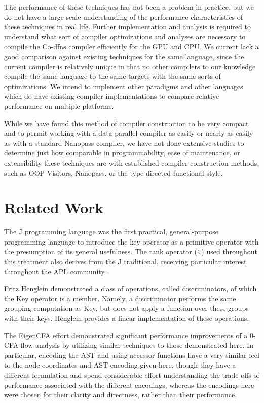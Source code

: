 \documentclass[numbers,preprint]{sigplanconf}
\begin{document}
The performance of these techniques has not been a problem in practice, but 
we do not have a large scale understanding of the performance characteristics 
of these techniques in real life. Further implementation and analysis is 
required to understand what sort of compiler optimizations and analyses are 
necessary to compile the Co-dfns compiler efficiently for the GPU and CPU. 
We current lack a good comparison against existing techniques for the same 
language, since the current compiler is relatively unique in that no other 
compilers to our knowledge compile the same language to the same targets 
with the same sorts of optimizations. We intend to implement other paradigms 
and other languages which do have existing compiler implementations to compare 
relative performance on multiple platforms. 

While we have found this method of compiler construction to be very compact 
and to permit working with a data-parallel compiler as easily or nearly as 
easily as with a standard Nanopass compiler, we have not done extensive 
studies to determine just how comparable in programmability, ease of 
maintenance, or extensibility these techniques are with established 
compiler construction methods, such as OOP Visitors, Nanopass, or the 
type-directed functional style.

\section{Related Work}

The J programming language \cite{hui2014key} was the first practical,
general-purpose programming language to introduce the key operator as a
primitive operator with the presumption of its general usefulness. The
rank operator (⍤) used throughout this treatment also derives from
the J traditional, receiving particular interest throughout the APL
community \cite{bernecky1987rank,hui1995rank}.

Fritz Henglein demonstrated a class of operations, called
discriminators, of which the Key operator is a member.  
\cite{henglein2013dd}
Namely,
a discriminator performs the same grouping computation as Key, but
does not apply a function over these groups with their keys. Henglein
provides a linear implementation of these operations.

The EigenCFA effort \cite{prabhu2011eigencfa} demonstrated significant performance
improvements of a 0-CFA flow analysis by utilizing similar techniques
to those demonstrated here. In particular, encoding the AST and using
accessor functions have a very similar feel to the node coordinates and
AST encoding given here, though they have a different formulation and
spend considerable effort understanding the trade-offs of performance
associated with the different encodings, whereas the encodings here
were chosen for their clarity and directness, rather than their
performance.
\end{document}
